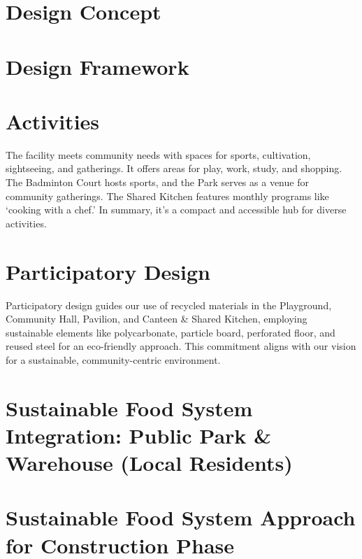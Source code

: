 \section*{
  Design Concept
 }

\vfill

\columnbreak%
\section*{
  Design Framework
 }

\vfill
\section*{
  Activities
 }

The facility meets community needs with spaces for sports, cultivation, sightseeing, and gatherings. It offers areas for play, work, study, and shopping. The Badminton Court hosts sports, and the Park serves as a venue for community gatherings. The Shared Kitchen features monthly programs like `cooking with a chef.' In summary, it's a compact and accessible hub for diverse activities.
\vfill
\section*{
  Participatory Design
 }
\begin{center}
	\begin{minipage}{0.9\linewidth}
		
	\end{minipage}
\end{center}
Participatory design guides our use of recycled materials in the Playground, Community Hall, Pavilion, and Canteen \& Shared Kitchen, employing sustainable elements like polycarbonate, particle board, perforated floor, and reused steel for an eco-friendly approach. This commitment aligns with our vision for a sustainable, community-centric environment.
\newpage
\section*{
  Sustainable Food System Integration: Public Park \& Warehouse (Local Residents)
 }
\begin{center}
	\begin{minipage}{0.97\linewidth}
		
	\end{minipage}
\end{center}
\vfill
\section*{
  Sustainable Food System Approach for Construction Phase
 }
\begin{center}
	\begin{minipage}{0.97\linewidth}
		
	\end{minipage}
\end{center}
